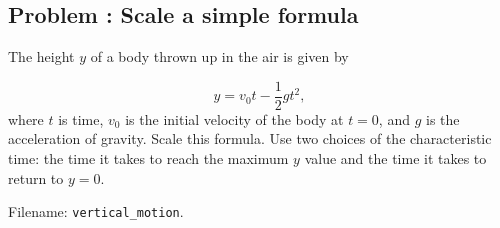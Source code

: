 \documentclass[graybox,envcountchap,sectrefs,final]{svmonodo}
\newenvironment{doconceexercise}{}{}
\newcounter{doconceexercisecounter}
\begin{document}
\begin{doconceexercise}

\subsection*{Problem \thedoconceexercisecounter: Scale a simple formula}

\label{sec:scale:exer:ball_y}

The height $y$ of a body thrown up in the air is given by

\[ y = v_0t - \frac{1}{2}gt^2,\]
where $t$ is time, $v_0$ is the initial velocity of the body at $t=0$,
and $g$ is the acceleration of gravity. Scale this formula. Use
two choices of the characteristic time: the time it takes to reach the
maximum $y$ value and the time it takes to return to $y=0$.


\noindent Filename: \Verb!vertical_motion!.

\end{doconceexercise}
\end{document}
